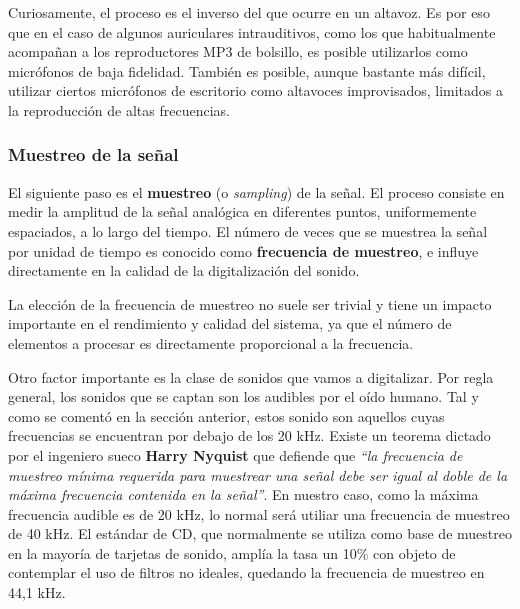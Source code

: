 Curiosamente, el proceso es el inverso del que ocurre en un altavoz. Es por eso
que en el caso de algunos auriculares intrauditivos, como los que habitualmente
acompañan a los reproductores MP3 de bolsillo, es posible utilizarlos como
micrófonos de baja fidelidad. También es posible, aunque bastante más difícil,
utilizar ciertos micrófonos de escritorio como altavoces improvisados, limitados
a la reproducción de altas frecuencias.

\subsubsection{Muestreo de la señal}

El siguiente paso es el \textbf{muestreo} (o \textit{sampling}) de la señal. El
proceso consiste en medir la amplitud de la señal analógica en diferentes
puntos, uniformemente espaciados, a lo largo del tiempo. El número de veces que
se muestrea la señal por unidad de tiempo es conocido como \textbf{frecuencia de
  muestreo}, e influye directamente en la calidad de la digitalización del sonido.

La elección de la frecuencia de muestreo no suele ser trivial y tiene un impacto
importante en el rendimiento y calidad del sistema, ya que el número de
elementos a procesar es directamente proporcional a la frecuencia. 

Otro factor importante es la clase de sonidos que vamos a digitalizar. Por regla
general, los sonidos que se captan son los audibles por el oído humano. Tal y
como se comentó en la sección anterior, estos sonido son aquellos cuyas
frecuencias se encuentran por debajo de los 20 kHz. Existe un teorema dictado
por el ingeniero sueco \textbf{Harry Nyquist} que defiende que \textit{``la
  frecuencia de muestreo mínima requerida para muestrear una señal debe ser
  igual al doble de la máxima frecuencia contenida en la señal''}. En nuestro
caso, como la máxima frecuencia audible es de 20 kHz, lo normal será utiliar una
frecuencia de muestreo de 40 kHz. El estándar de CD, que normalmente se utiliza
como base de muestreo en la mayoría de tarjetas de sonido, amplía la tasa un
10\% con objeto de contemplar el uso de filtros no ideales, quedando la
frecuencia de muestreo en 44,1 kHz.



